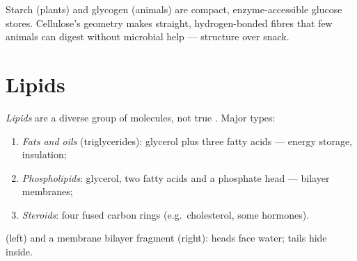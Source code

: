 \begin{proposition}\label{prop:g10:molecules-of-life:poly-roles}
Starch (plants) and glycogen (animals) are compact, enzyme-accessible
glucose stores. Cellulose's geometry makes straight, hydrogen-bonded
fibres that few animals can digest without microbial help --- structure
over snack.
\end{proposition}
\admitted

\section{Lipids}

\begin{definition}[Lipids]\label{def:g10:molecules-of-life:lipids}
\emph{Lipids} are a diverse group of  molecules,
not true . Major types:
\begin{enumerate}
  \item \emph{Fats and oils}
        (triglycerides): glycerol plus three fatty acids --- energy
        storage, insulation;
  \item \emph{Phospholipids}: glycerol, two fatty
        acids and a  phosphate head --- bilayer membranes;
  \item \emph{Steroids}: four fused carbon rings
        (e.g.\ cholesterol, some hormones).
\end{enumerate}
\end{definition}

\begin{omfigure}

{\small {} (left) and a membrane bilayer fragment (right):
heads face water; tails hide inside.}
\end{omfigure}

